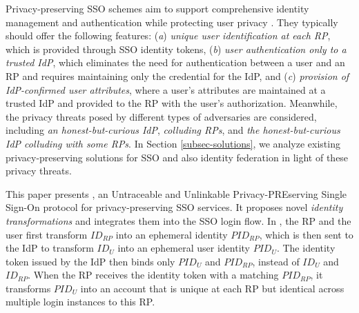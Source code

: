 Privacy-preserving SSO schemes aim to support comprehensive identity management and authentication while protecting user privacy \cite{maler2008venn, NIST2017draft, BrowserID, SPRESSO}.
They typically should offer the following features:
(\emph{a}) \emph{unique user identification at each RP}, which is provided through SSO identity tokens,
(\emph{b}) \emph{user authentication only to a trusted IdP}, which eliminates the need for authentication between a user and an RP and requires maintaining only the credential for the IdP, 
and (\emph{c}) \emph{provision of IdP-confirmed user attributes},  where a user's attributes are maintained at a trusted IdP and provided to the RP with the user's authorization.
 Meanwhile, the privacy threats posed by different types of adversaries are considered, including \emph{an honest-but-curious IdP}, \emph{colluding RPs}, and \emph{the honest-but-curious IdP colluding with some RPs}.
In Section \ref{subsec-solutions}, we analyze existing privacy-preserving solutions for SSO and also identity federation in light of these privacy threats.


This paper presents \usso, an Untraceable and Unlinkable Privacy-PREserving Single Sign-On protocol for privacy-preserving SSO services. It proposes novel {\em identity transformations} and integrates them into the SSO login flow.
In \usso, the RP and the user first transform $ID_{RP}$ into an ephemeral identity $PID_{RP}$, which is then sent to the IdP to transform $ID_U$ into an ephemeral user identity $PID_U$.
The identity token issued by the IdP then binds only $PID_U$ and $PID_{RP}$, instead of $ID_U$ and $ID_{RP}$. When the RP receives the identity token with a matching $PID_{RP}$, it transforms $PID_U$ into an account that is unique at each RP but identical across multiple login instances to this RP.


